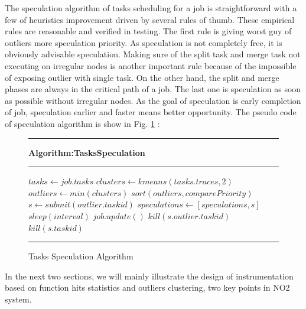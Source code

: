 The speculation algorithm of tasks scheduling for a job is straightforward with a few of heuristics improvement driven by several rules of thumb. These empirical rules are reasonable and verified in testing. The first rule is giving worst guy of outliers more speculation priority. As speculation is not completely free, it is obviously advisable speculation. Making sure of the split task and merge task not executing on irregular nodes is another important rule because of the impossible of exposing outlier with single task. On the other hand, the split and merge phases are always in the critical path of a job. The last one is speculation as soon as possible without irregular nodes. As the goal of speculation is early completion of job, speculation earlier and faster means better opportunity. The pseudo code of speculation algorithm is show in Fig. \ref{fig-spec-algo} :

\begin{figure}
\rule[-.2pt]{0.9\columnwidth}{0.9pt}
\textbf{Algorithm:TasksSpeculation}
\rule[-.2pt]{0.9\columnwidth}{0.5pt}

\begin{algorithmic}[1]




    \State $tasks\gets job.tasks$
    \State $clusters\gets kmeans(tasks.traces, 2)$
        \State $outliers\gets min(clusters)$
        \State $sort(outliers, comparePriority)$
            \State $s\gets submit(outlier.taskid)$
            \State $speculations\gets [speculations, s]$
        \EndFor
    \EndIf
    \State $sleep(interval)$
    \State $job.update()$
            \State $kill(s.outlier.taskid)$
            \State $kill(s.taskid)$
        \EndIf
    \EndFor
\EndWhile\label{specendwhile}
\end{algorithmic}
\rule[-.2pt]{0.9\columnwidth}{0.8pt}
\caption{Tasks Speculation Algorithm}\label{fig-spec-algo}
\end{figure}

In the next two sections, we will mainly illustrate the design of instrumentation based on function hits statistics and outliers clustering, two key points in NO2 system.